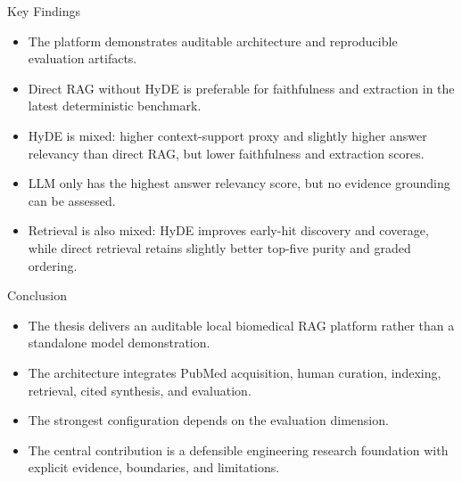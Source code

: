 \documentclass[aspectratio=169,11pt]{beamer}
\begin{document}
\begin{frame}{Key Findings}
\begin{itemize}
  \item The platform demonstrates auditable architecture and reproducible evaluation artifacts.
  \item Direct RAG without HyDE is preferable for faithfulness and extraction in the latest deterministic benchmark.
  \item HyDE is mixed: higher context-support proxy and slightly higher answer relevancy than direct RAG, but lower faithfulness and extraction scores.
  \item LLM only has the highest answer relevancy score, but no evidence grounding can be assessed.
  \item Retrieval is also mixed: HyDE improves early-hit discovery and coverage, while direct retrieval retains slightly better top-five purity and graded ordering.
\end{itemize}
\end{frame}

\begin{frame}{Conclusion}
\begin{itemize}
  \item The thesis delivers an auditable local biomedical RAG platform rather than a standalone model demonstration.
  \item The architecture integrates PubMed acquisition, human curation, indexing, retrieval, cited synthesis, and evaluation.
  \item The strongest configuration depends on the evaluation dimension.
  \item The central contribution is a defensible engineering research foundation with explicit evidence, boundaries, and limitations.
\end{itemize}
\end{frame}
\end{document}

